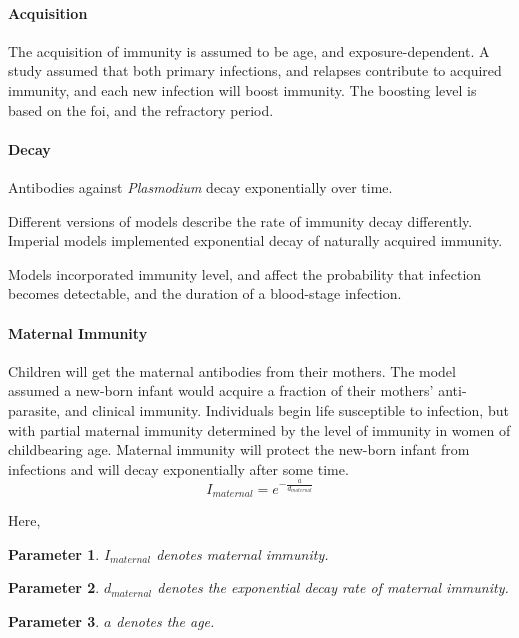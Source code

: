 \documentclass[a4paper, 12pt, twoside]{article}
\newtheorem{parameter}{Parameter}
\begin{document}
\paragraph{Acquisition}%
\label{par:acquisition}
The acquisition of immunity is assumed to be age, and exposure-dependent.
A study\cite{White2018b} assumed that both primary infections, and relapses contribute to acquired immunity, and each new infection will boost immunity.
The boosting level is based on the \gls{foi}, and the refractory period.

\paragraph{Decay}%
\label{par:decay}
Antibodies against \textit{Plasmodium} decay exponentially over time.

Different versions of models describe the rate of immunity decay differently.
Imperial models implemented exponential decay of naturally acquired immunity.


Models incorporated immunity level, and affect the probability that infection becomes detectable, and the duration of a blood-stage infection.

\paragraph{Maternal Immunity}%
\label{subsec:maternal_immunity}
Children will get the maternal antibodies from their mothers.
The model assumed a new-born infant would acquire a fraction of their mothers’ anti-parasite, and clinical immunity.
Individuals begin life susceptible to infection, but with partial maternal immunity determined by the level of immunity in women of childbearing age.
Maternal immunity will protect the new-born infant from infections and will decay exponentially after some time. 
\begin{equation}
	I_{maternal} = e^{- \frac{a}{d_{maternal}}}
\end{equation}

Here,

\begin{parameter}
	{$I_{maternal}$}
	{denotes maternal immunity.}
\end{parameter}
\begin{parameter}
	{$d_{maternal}$}
	{denotes the exponential decay rate of maternal immunity.}
\end{parameter}
\begin{parameter}
	{$a$}
	{denotes the age.}
\end{parameter}
\end{document}
